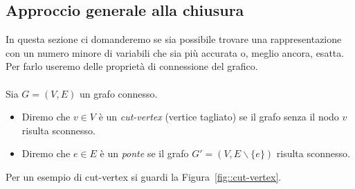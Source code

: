 \subsection{Approccio generale alla chiusura}
In questa sezione ci domanderemo se sia possibile trovare una rappresentazione con un numero minore di variabili che sia pi\`u accurata o,  meglio ancora, esatta.  Per farlo useremo delle propriet\`a di connessione del grafico.\\ \\
Sia $G=(V,E)$ un grafo connesso.
\begin{itemize}
\item Diremo che $v\in V$ \`e un \textit{cut-vertex} (vertice tagliato) se il grafo senza il nodo $v$ risulta sconnesso.
\item Diremo che $e\in E$ \`e un \textit{ponte} se il grafo $G'=(V, E\backslash\{e\})$ risulta sconnesso.
\end{itemize}
Per un esempio di cut-vertex si guardi la Figura~\ref{fig::cut-vertex}.
